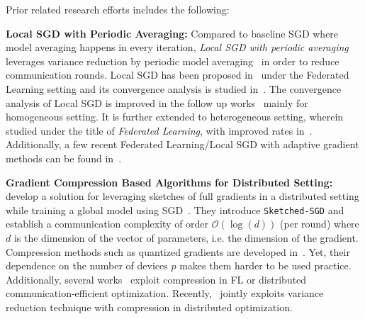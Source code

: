 \documentclass[twoside]{article}
\newcommand{\todo}[1]{\textcolor{red}{ToDo:~#1}}
\begin{document}
Prior related research efforts includes the following:

\noindent\textbf{Local SGD with Periodic Averaging:}
Compared to baseline SGD where model averaging happens in every iteration, \emph{Local SGD with periodic averaging} leverages variance reduction by periodic model averaging~\cite{zhang2016parallel} in order to reduce communication rounds. 
Local SGD has been proposed in~\cite{mcmahan2016communication,konevcny2016federated} under the Federated Learning setting and its convergence analysis is studied in~\cite{zhou2018convergence,yu2019parallel,stich2019local,wang2018cooperative}. 
The convergence analysis of Local SGD is improved in the follow up works~\cite{haddadpour2019local,haddadpour2019trading,basu2019qsparse,haddadpour2019convergence,bayoumi2020tighter,stich2019error} mainly for homogeneous setting. 
It is further extended to heterogeneous setting, wherein studied under the title of \emph{Federated Learning}, with improved rates in~\cite{yu2019linear,li2019convergence,sahu2018convergence,liang2019variance,haddadpour2019convergence,karimireddy2019scaffold}. 
Additionally, a few recent Federated Learning/Local SGD with adaptive gradient methods can be found in~\cite{reddi2020adaptive,chen2020toward}.


\vspace{0.05in}
\noindent\textbf{Gradient Compression Based Algorithms for Distributed Setting:}~\cite{ivkin2019communication} develop a solution for leveraging sketches of full gradients in a distributed setting while training a global model using SGD~\cite{robbins1951stochastic, bottou-bousquet-2008}. 
They introduce \texttt{Sketched-SGD} and establish a communication complexity of order $\mathcal{O}(\log(d))$ (per round) where $d$ is the dimension of the vector of parameters, i.e. the dimension of the gradient.
Compression methods such as quantized gradients are developed in~\cite{alistarh2017qsgd,lin2017deep,stich2018sparsified,horvath2019stochastic}. 
Yet, their dependence on the number of devices $p$ makes them harder to be used practice. 
Additionally, several works~\cite{haddadpour2020federated,reisizadeh2020fedpaq,basu2019qsparse,horvath2019stochastic} exploit compression in FL or distributed communication-efficient optimization. 
Recently,~\cite{horvath2020better} jointly exploits variance reduction technique with compression in distributed optimization.
\end{document}
